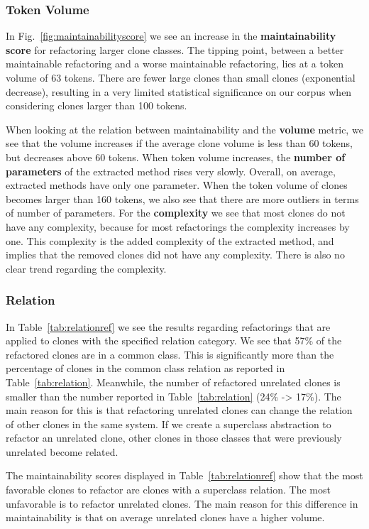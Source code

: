 \subsubsection{Token Volume}
In Fig.~\ref{fig:maintainabilityscore} we see an increase in the \textbf{maintainability score} for refactoring larger clone classes. The tipping point, between a better maintainable refactoring and a worse maintainable refactoring, lies at a token volume of 63 tokens. There are fewer large clones than small clones (exponential decrease), resulting in a very limited statistical significance on our corpus when considering clones larger than 100 tokens.

When looking at the relation between maintainability and the \textbf{volume} metric, we see that the volume increases if the average clone volume is less than 60 tokens, but decreases above 60 tokens. When token volume increases, the \textbf{number of parameters} of the extracted method rises very slowly. Overall, on average, extracted methods have only one parameter. When the token volume of clones becomes larger than 160 tokens, we also see that there are more outliers in terms of number of parameters. For the \textbf{complexity} we see that most clones do not have any complexity, because for most refactorings the complexity increases by one. This complexity is the added complexity of the extracted method, and implies that the removed clones did not have any complexity. There is also no clear trend regarding the complexity.

\subsubsection{Relation}
In Table~\ref{tab:relationref} we see the results regarding refactorings that are applied to clones with the specified relation category. We see that 57\% of the refactored clones are in a common class. This is significantly more than the percentage of clones in the common class relation as reported in Table~\ref{tab:relation}. Meanwhile, the number of refactored unrelated clones is smaller than the number reported in Table~\ref{tab:relation} (24\% -> 17\%). The main reason for this is that refactoring unrelated clones can change the relation of other clones in the same system. If we create a superclass abstraction to refactor an unrelated clone, other clones in those classes that were previously unrelated become related.

The maintainability scores displayed in Table~\ref{tab:relationref} show that the most favorable clones to refactor are clones with a superclass relation. The most unfavorable is to refactor unrelated clones. The main reason for this difference in maintainability is that on average unrelated clones have a higher volume.


